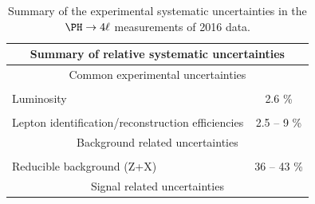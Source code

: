 \begin{table}[!htb]
	\begin{center}
		\small
		\caption{
			Summary of the experimental systematic uncertainties in the $\Hllll$ measurements of 2016 data. %
			\label{tab:SystOverviewA}
		}
		\begin{tabular}{|lc|} 
			\hline %
			\hline %
			\multicolumn{2}{|c|}{\textbf{Summary of relative systematic uncertainties}} \\
			\hline %
			\hline %
			\multicolumn{2}{|c|}{Common experimental uncertainties} \\
			\hline %
			\vspace{-0.4cm} & \\
			Luminosity & 2.6 \%  \\ 
			\vspace{-0.4cm} & \\
			Lepton identification/reconstruction efficiencies & 2.5 -- 9 \% \\ 
			\hline %
			\hline %
			\multicolumn{2}{|c|}{Background related uncertainties} \\
			\hline %
			\vspace{-0.4cm} & \\
			Reducible background (Z+X) & 36 -- 43 \% \\ 
			\hline %
			\hline %
			\multicolumn{2}{|c|}{Signal related uncertainties} \\

\end{tabular}
\end{center}
\end{table}
